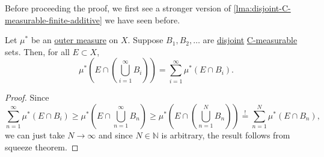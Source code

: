 Before proceeding the proof, we first see a stronger version of \autoref{lma:disjoint-C-measurable-finite-additive} we have seen before.

\begin{lemma}\label{lma:disjoint-C-measurable-infinite-additive}
	Let \(\mu^{\ast} \) be an \hyperref[def:outer-measure]{outer measure} on \(X\). Suppose \(B_1, B_2, \dots\) are \underline{disjoint} \hyperref[def:C-measurable]{C-measurable} sets. Then, for all \(E\subset X\),
	\[
		\mu^{\ast} \left(E\cap \left(\bigcup_{i=1}^{\infty} B_{i}\right)\right) = \sum_{i=1}^{\infty} \mu^{\ast} \left(E\cap B_i\right).
	\]
\end{lemma}
\begin{proof}
	Since
	\[
		\sum_{n=1}^{\infty} \mu^{\ast} (E\cap B_{i}) \geq \mu^{\ast} \left(E\cap \bigcup_{n=1}^{\infty} B_{n}\right) \geq\mu^{\ast} \left(E\cap \left(\bigcup_{n=1}^{N} B_{n}\right)\right) \overset{\hyperref[lma:disjoint-C-measurable-finite-additive]{!}}{=} \sum_{n=1}^{N} \mu^{\ast} \left(E\cap B_n\right),
	\]
	we can just take \(N\to \infty \) and since \(N\in\mathbb{N} \) is arbitrary, the result follows from squeeze theorem.
\end{proof}

